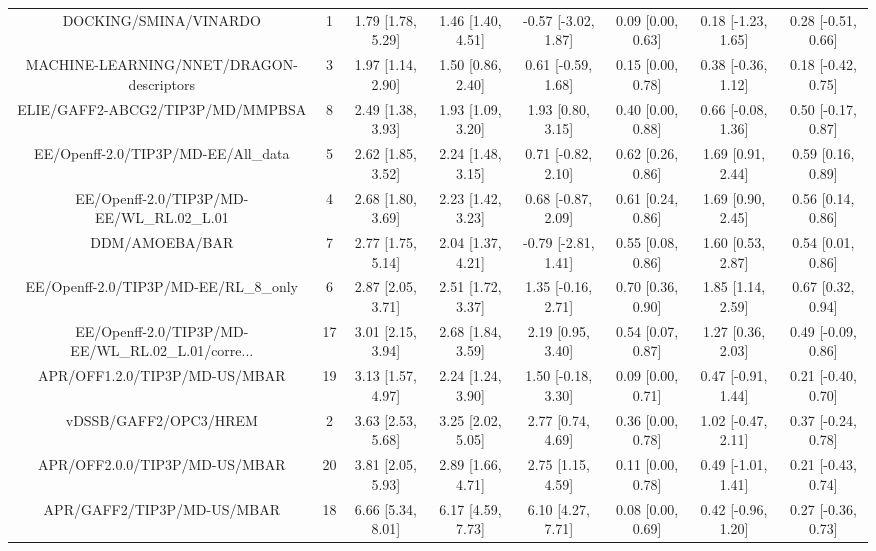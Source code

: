 \documentclass[8pt]{article}
\begin{document}
\begin{center}
\begin{footnotesize}
\begin{longtable}{|cccccccc|}
\bottomrule
\endlastfoot
                             DOCKING/SMINA/VINARDO &   1 & 1.79 [1.78, 5.29] & 1.46 [1.40, 4.51] & -0.57 [-3.02, 1.87] & 0.09 [0.00, 0.63] & 0.18 [-1.23, 1.65] & 0.28 [-0.51, 0.66] \\
          MACHINE-LEARNING/NNET/DRAGON-descriptors &   3 & 1.97 [1.14, 2.90] & 1.50 [0.86, 2.40] &  0.61 [-0.59, 1.68] & 0.15 [0.00, 0.78] & 0.38 [-0.36, 1.12] & 0.18 [-0.42, 0.75] \\
                  ELIE/GAFF2-ABCG2/TIP3P/MD/MMPBSA &   8 & 2.49 [1.38, 3.93] & 1.93 [1.09, 3.20] &   1.93 [0.80, 3.15] & 0.40 [0.00, 0.88] & 0.66 [-0.08, 1.36] & 0.50 [-0.17, 0.87] \\
               EE/Openff-2.0/TIP3P/MD-EE/All\_data &   5 & 2.62 [1.85, 3.52] & 2.24 [1.48, 3.15] &  0.71 [-0.82, 2.10] & 0.62 [0.26, 0.86] &  1.69 [0.91, 2.44] &  0.59 [0.16, 0.89] \\
         EE/Openff-2.0/TIP3P/MD-EE/WL\_RL.02\_L.01 &   4 & 2.68 [1.80, 3.69] & 2.23 [1.42, 3.23] &  0.68 [-0.87, 2.09] & 0.61 [0.24, 0.86] &  1.69 [0.90, 2.45] &  0.56 [0.14, 0.86] \\
                                    DDM/AMOEBA/BAR &   7 & 2.77 [1.75, 5.14] & 2.04 [1.37, 4.21] & -0.79 [-2.81, 1.41] & 0.55 [0.08, 0.86] &  1.60 [0.53, 2.87] &  0.54 [0.01, 0.86] \\
             EE/Openff-2.0/TIP3P/MD-EE/RL\_8\_only &   6 & 2.87 [2.05, 3.71] & 2.51 [1.72, 3.37] &  1.35 [-0.16, 2.71] & 0.70 [0.36, 0.90] &  1.85 [1.14, 2.59] &  0.67 [0.32, 0.94] \\
EE/Openff-2.0/TIP3P/MD-EE/WL\_RL.02\_L.01/corre... &  17 & 3.01 [2.15, 3.94] & 2.68 [1.84, 3.59] &   2.19 [0.95, 3.40] & 0.54 [0.07, 0.87] &  1.27 [0.36, 2.03] & 0.49 [-0.09, 0.86] \\
                     APR/OFF1.2.0/TIP3P/MD-US/MBAR &  19 & 3.13 [1.57, 4.97] & 2.24 [1.24, 3.90] &  1.50 [-0.18, 3.30] & 0.09 [0.00, 0.71] & 0.47 [-0.91, 1.44] & 0.21 [-0.40, 0.70] \\
                             vDSSB/GAFF2/OPC3/HREM &   2 & 3.63 [2.53, 5.68] & 3.25 [2.02, 5.05] &   2.77 [0.74, 4.69] & 0.36 [0.00, 0.78] & 1.02 [-0.47, 2.11] & 0.37 [-0.24, 0.78] \\
                     APR/OFF2.0.0/TIP3P/MD-US/MBAR &  20 & 3.81 [2.05, 5.93] & 2.89 [1.66, 4.71] &   2.75 [1.15, 4.59] & 0.11 [0.00, 0.78] & 0.49 [-1.01, 1.41] & 0.21 [-0.43, 0.74] \\
                        APR/GAFF2/TIP3P/MD-US/MBAR &  18 & 6.66 [5.34, 8.01] & 6.17 [4.59, 7.73] &   6.10 [4.27, 7.71] & 0.08 [0.00, 0.69] & 0.42 [-0.96, 1.20] & 0.27 [-0.36, 0.73] \\
\end{longtable}
\end{footnotesize}
\end{center}
\end{document}
